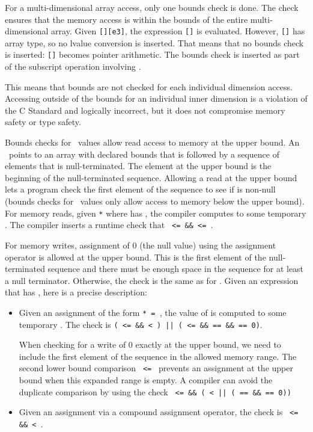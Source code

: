 For a multi-dimensional array access, only one bounds check is done.
The check ensures that the memory access is within the bounds of the entire multi-dimensional
array.  Given \texttt{[][e3]}, the expression \texttt{[]} is
evaluated.  However, \texttt{[]} has array type, so no lvalue
conversion is inserted. That means that no bounds check is inserted:
\texttt{[]} becomes pointer arithmetic.  The bounds check
is inserted as part of the subscript operation involving .

This means that bounds are not checked for each individual dimension access.
Accessing outside of the bounds for an
individual inner dimension is a violation of the C Standard and logically incorrect,
but it does not compromise memory safety or type safety.

Bounds checks for \ntarrayptr\ values allow read access to memory
at the upper bound.  An \ntarrayptr\ points to an array with declared bounds
that is followed by a sequence of elements that is null-terminated.
The element at the upper bound is the beginning of the null-terminated
sequence.  Allowing a read at the upper bound lets a program check the
first element of the sequence to see if is non-null
(bounds checks for \arrayptr\ values only allow access to
memory below the upper bound).  For memory reads,
given \texttt{*} where {} has {},
the compiler computes  to some temporary .
The compiler inserts a runtime check that  \texttt{ <=  \&\&
 <= }.

For memory writes, assignment of 0 (the null value)
using the assignment operator is allowed at the upper bound.
This is the first element of the null-terminated sequence
and there must be enough space in the sequence for at least a null terminator.
Otherwise, the check
is the same as for \arrayptr.   Given an expression {} that
has {}, here is a precise description:
\begin{itemize}
\item Given an assignment of the form \texttt{* = }, the
value of  is computed to some temporary .  The
check is \texttt{( <=  \&\&  < ) ||
( <=  \&\&  ==  \&\&  == 0)}.

When checking for a write of 0 exactly at the upper bound, we need
to include the first element of the sequence in the allowed memory range.
The second lower bound comparison \texttt{ <= }
prevents an assignment
at the upper bound when this expanded range is empty.
A compiler can avoid the duplicate comparison by using
the check
\texttt{ <=  \&\& ( <  ||
( ==  \&\&  == 0))}
\item Given an assignment via a compound assignment operator, the check
is \texttt{ <=  \&\&  < }.
\end{itemize}

